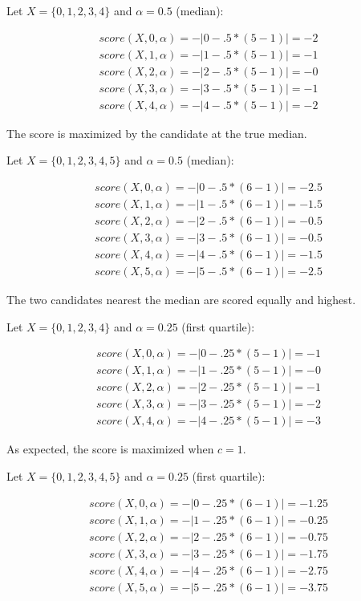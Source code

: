 \documentclass{article}
\begin{document}
Let $X = \{0,1,2,3,4\}$ and $\alpha = 0.5$ (median):

\begin{align*}
    score(X, 0, \alpha) = -|0 - .5 * (5 - 1)| = -2 \\
    score(X, 1, \alpha) = -|1 - .5 * (5 - 1)| = -1 \\
    score(X, 2, \alpha) = -|2 - .5 * (5 - 1)| = -0 \\
    score(X, 3, \alpha) = -|3 - .5 * (5 - 1)| = -1 \\
    score(X, 4, \alpha) = -|4 - .5 * (5 - 1)| = -2
\end{align*}

The score is maximized by the candidate at the true median.

Let $X = \{0,1,2,3,4,5\}$ and $\alpha = 0.5$ (median):

\begin{align*}
    score(X, 0, \alpha) = -|0 - .5 * (6 - 1)| = -2.5 \\
    score(X, 1, \alpha) = -|1 - .5 * (6 - 1)| = -1.5 \\
    score(X, 2, \alpha) = -|2 - .5 * (6 - 1)| = -0.5 \\
    score(X, 3, \alpha) = -|3 - .5 * (6 - 1)| = -0.5 \\
    score(X, 4, \alpha) = -|4 - .5 * (6 - 1)| = -1.5 \\
    score(X, 5, \alpha) = -|5 - .5 * (6 - 1)| = -2.5
\end{align*}

The two candidates nearest the median are scored equally and highest.

Let $X = \{0,1,2,3,4\}$ and $\alpha = 0.25$ (first quartile):

\begin{align*}
    score(X, 0, \alpha) = -|0 - .25 * (5 - 1)| = -1 \\
    score(X, 1, \alpha) = -|1 - .25 * (5 - 1)| = -0 \\
    score(X, 2, \alpha) = -|2 - .25 * (5 - 1)| = -1 \\
    score(X, 3, \alpha) = -|3 - .25 * (5 - 1)| = -2 \\
    score(X, 4, \alpha) = -|4 - .25 * (5 - 1)| = -3
\end{align*}

As expected, the score is maximized when $c = 1$.

Let $X = \{0,1,2,3,4,5\}$ and $\alpha = 0.25$ (first quartile):

\begin{align*}
    score(X, 0, \alpha) = -|0 - .25 * (6 - 1)| = -1.25 \\
    score(X, 1, \alpha) = -|1 - .25 * (6 - 1)| = -0.25 \\
    score(X, 2, \alpha) = -|2 - .25 * (6 - 1)| = -0.75 \\
    score(X, 3, \alpha) = -|3 - .25 * (6 - 1)| = -1.75 \\
    score(X, 4, \alpha) = -|4 - .25 * (6 - 1)| = -2.75 \\
    score(X, 5, \alpha) = -|5 - .25 * (6 - 1)| = -3.75
\end{align*}
\end{document}
